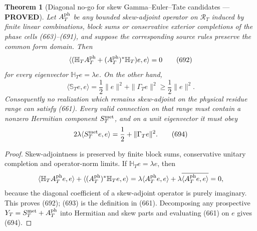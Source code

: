 \documentclass[11pt]{article}
\newtheorem{theorem}{Theorem}
\newcommand{\PROVED}{\textcolor{green!45!black}{\textbf{PROVED}}}
\begin{document}
\begin{theorem}[Diagonal no-go for skew Gamma--Euler--Tate candidates ---
\PROVED]
Let \(A_T^{\rm ph}\) be any bounded skew-adjoint operator on
\(\mathscr R_T\) induced by finite linear combinations, block sums or
conservative exterior completions of the phase cells (663)--(691), and
suppose the corresponding source rules preserve the common form domain.
Then
\begin{equation}
 \langle
  (\mathbb H_TA_T^{\rm ph}+
   (A_T^{\rm ph})^*\mathbb H_T)e,e
 \rangle=0                                          \tag{692}
\end{equation}
for every eigenvector \(\mathbb H_Te=\lambda e\).  On the other hand,
\begin{equation}
 \langle\mathbb S_Te,e\rangle
 =\frac12\|e\|^2+\|\Gamma_Te\|^2
 \ge\frac12\|e\|^2.                                 \tag{693}
\end{equation}
Consequently no realization which remains skew-adjoint on the physical
residue range can satisfy (661).  Every valid
connection on that range must contain a nonzero Hermitian component
\(S_T^{\rm met}\), and on a unit eigenvector it must obey
\begin{equation}
 2\lambda\langle S_T^{\rm met}e,e\rangle
 =\frac12+\|\Gamma_Te\|^2.                          \tag{694}
\end{equation}
\end{theorem}

\begin{proof}
Skew-adjointness is preserved by finite block sums, conservative unitary
completion and operator-norm limits.  If
\(\mathbb H_Te=\lambda e\), then
\[
 \langle\mathbb H_TA_T^{\rm ph}e,e\rangle+
 \langle(A_T^{\rm ph})^*\mathbb H_Te,e\rangle
 =\lambda\langle A_T^{\rm ph}e,e\rangle+
  \lambda\overline{\langle A_T^{\rm ph}e,e\rangle}=0,
\]
because the diagonal coefficient of a skew-adjoint operator is purely
imaginary.  This proves (692); (693) is the definition in (661).
Decomposing any prospective \(Y_T=S_T^{\rm met}+A_T^{\rm ph}\) into
Hermitian and skew parts and evaluating (661) on \(e\) gives (694).
\end{proof}
\end{document}
